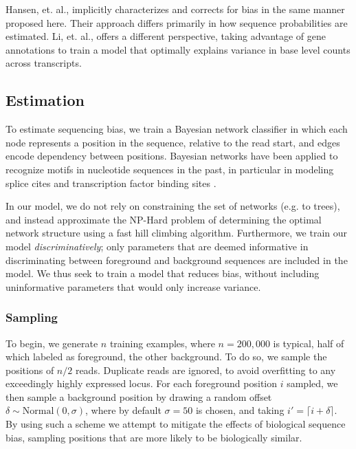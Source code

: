 \documentclass{bioinfo}
\begin{document}
Hansen, et. al., \cite{Hansen2010} implicitly characterizes and corrects for
bias in the same manner proposed here. Their approach differs primarily in how
sequence probabilities are estimated. Li, et. al., \cite{Li2010} offers a
different perspective, taking advantage of gene annotations to train a model
that optimally explains variance in base level counts across transcripts.


\subsection{Estimation}

To estimate sequencing bias, we train a Bayesian network classifier in which
each node represents a position in the sequence, relative to the read start, and
edges encode dependency between positions. Bayesian networks have been
applied to recognize motifs in nucleotide sequences in the past, in particular
in modeling splice cites \cite{Cai2000} \cite{Chen2005} and transcription factor
binding sites \cite{BenGal2005} \cite{Grau2006} \cite{Pudimat2005}. 

In our model, we do not rely on constraining the set of networks (e.g. to
trees), and instead approximate the NP-Hard problem of determining the optimal
network structure using a fast hill climbing algorithm. Furthermore, we
train our model \emph{discriminatively}; only parameters that are deemed
informative in discriminating between foreground and background sequences are
included in the model. We thus seek to train a model that reduces bias, without
including uninformative parameters that would only increase variance.


\subsubsection{Sampling}

To begin, we generate $n$ training examples, where $n = 200,000$ is typical, half of
which labeled as foreground, the other background. To do so, we sample the
positions of $n/2$ reads. Duplicate reads are ignored, to avoid overfitting to
any exceedingly highly expressed locus.  For each foreground position $i$
sampled, we then sample a background position by drawing a random offset $\delta
\sim \text{Normal}( 0, \sigma )$, where by default $\sigma = 50$ is chosen, and
taking $i' = \lceil i + \delta \rceil$. By using such a scheme we attempt to
mitigate the effects of biological sequence bias, sampling positions that are
more likely to be biologically similar.
\end{document}
